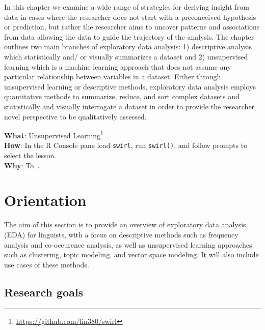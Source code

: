 \documentclass[
  letterpaper,
]{latex/krantz}
\DeclareRobustCommand{\href}[2]{#2\footnote{\url{#1}}}
\begin{document}
In this chapter we examine a wide range of strategies for deriving
insight from data in cases where the researcher does not start with a
preconceived hypothesis or prediction, but rather the researcher aims to
uncover patterns and associations from data allowing the data to guide
the trajectory of the analysis. The chapter outlines two main branches
of exploratory data analysis: 1) descriptive analysis which
statistically and/ or visually summarizes a dataset and 2) unsupervised
learning which is a machine learning approach that does not assume any
particular relationship between variables in a dataset. Either through
unsupervised learning or descriptive methods, exploratory data analysis
employs quantitative methods to summarize, reduce, and sort complex
datasets and statistically and visually interrogate a dataset in order
to provide the researcher novel perspective to be qualitatively
assessed.

\begin{tcolorbox}[enhanced jigsaw, colframe=quarto-callout-tip-color-frame, titlerule=0mm, coltitle=black, colback=white, opacitybacktitle=0.6, colbacktitle=quarto-callout-tip-color!10!white, left=2mm, arc=.35mm, leftrule=.75mm, rightrule=.15mm, bottomtitle=1mm, toptitle=1mm, breakable, bottomrule=.15mm, title=\textcolor{quarto-callout-tip-color}{\faLightbulb}\hspace{0.5em}{Swirl}, toprule=.15mm, opacityback=0]

\textbf{What}: \href{https://github.com/lin380/swirl}{Unsupervised
Learning}\\
\textbf{How}: In the R Console pane load \texttt{swirl}, run
\texttt{swirl()}, and follow prompts to select the lesson.\\
\textbf{Why}: To \ldots{}

\end{tcolorbox}

\hypertarget{eda-orientation}{%
\section{Orientation}\label{eda-orientation}}

The aim of this section is to provide an overview of exploratory data
analysis (EDA) for linguists, with a focus on descriptive methods such
as frequency analysis and co-occurence analysis, as well as unsupervised
learning approaches such as clustering, topic modeling, and vector space
modeling. It will also include use cases of these methods.

\hypertarget{eda-research-goals}{%
\subsection{Research goals}\label{eda-research-goals}}
\end{document}

